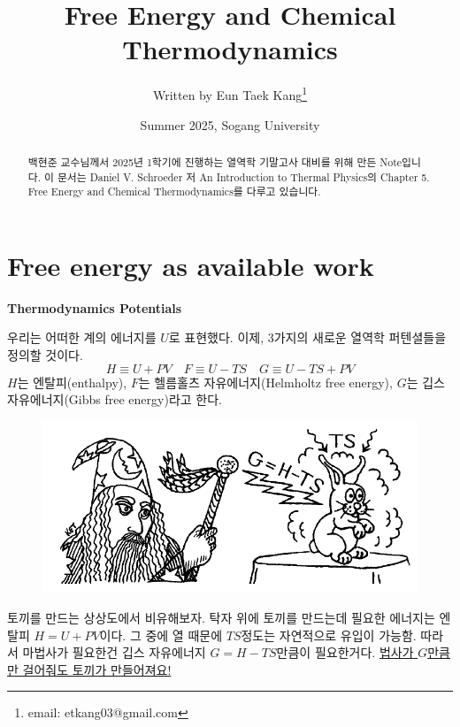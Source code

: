 \documentclass{article}
\title{\textsf{Free Energy and Chemical Thermodynamics}}
\author[1]{Written by Eun Taek Kang\thanks{email: etkang03@gmail.com}}
\affil[1]{Department of Physics, Sogang University, Seoul 04107, Korea}
\date{Summer 2025, Sogang University}
\begin{document}
\pagestyle{fancy}
    \fancyhf{}
    \fancyfoot[C]{\thepage}

\maketitle

\begin{abstract}
    백현준 교수님께서 2025년 1학기에 진행하는 열역학 기말고사 대비를 위해 만든 Note입니다. 이 문서는 Daniel V. Schroeder 저 An Introduction to Thermal Physics의 Chapter 5. Free Energy and Chemical Thermodynamics를 다루고 있습니다.
\end{abstract}

\newpage

\section{Free energy as available work}

\textbf{Thermodynamics Potentials}

우리는 어떠한 계의 에너지를 $U$로 표현했다. 이제, 3가지의 새로운 열역학 퍼텐셜들을 정의할 것이다.
\begin{equation}
    \boxed{H \equiv U + PV} \quad \boxed{F \equiv U - TS} \quad \boxed{G \equiv U - TS + PV}
\end{equation}
$H$는 엔탈피(enthalpy), $F$는 헬름홀츠 자유에너지(Helmholtz free energy), $G$는 깁스 자유에너지(Gibbs free energy)라고 한다. 

\begin{figure}[h]
\centering
\includegraphics[width=0.6\linewidth]{images/fig1_1.png}
\end{figure}

토끼를 만드는 상상도에서 비유해보자. 탁자 위에 토끼를 만드는데 필요한 에너지는 엔탈피 $H=U+PV$이다. 그 중에 열 때문에 $TS$정도는 자연적으로 유입이 가능함. 따라서 마법사가 필요한건 깁스 자유에너지 $G=H-TS$만큼이 필요한거다. \underline{법사가 $G$만큼만 걸어줘도 토끼가 만들어져요!}
\end{document}
